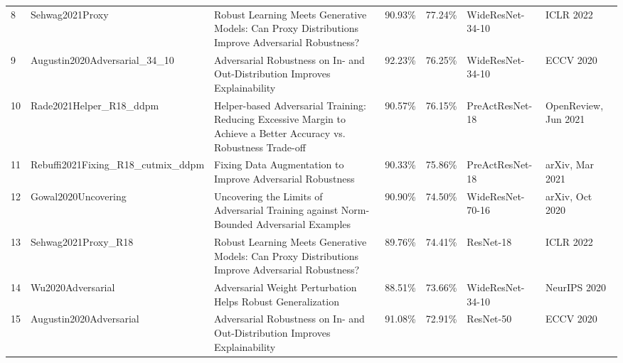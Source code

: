 \begin{table}[]
\begin{tabular}{lllllll}
    8  & Sehwag2021Proxy                          & Robust Learning Meets Generative Models: Can Proxy Distributions Improve Adversarial Robustness?                   & 90.93\%        & 77.24\%         & WideResNet-34-10 & ICLR 2022                                                  \\
    9  & Augustin2020Adversarial\_34\_10          & Adversarial Robustness on In- and Out-Distribution Improves Explainability                                         & 92.23\%        & 76.25\%         & WideResNet-34-10 & ECCV 2020                                                  \\
    10 & Rade2021Helper\_R18\_ddpm                & Helper-based Adversarial Training: Reducing Excessive Margin to Achieve a Better Accuracy vs. Robustness Trade-off & 90.57\%        & 76.15\%         & PreActResNet-18  & OpenReview, Jun 2021                                       \\
    11 & Rebuffi2021Fixing\_R18\_cutmix\_ddpm     & Fixing Data Augmentation to Improve Adversarial Robustness                                                         & 90.33\%        & 75.86\%         & PreActResNet-18  & arXiv, Mar 2021                                            \\
    12 & Gowal2020Uncovering                      & Uncovering the Limits of Adversarial Training against Norm-Bounded Adversarial Examples                            & 90.90\%        & 74.50\%         & WideResNet-70-16 & arXiv, Oct 2020                                            \\
    13 & Sehwag2021Proxy\_R18                     & Robust Learning Meets Generative Models: Can Proxy Distributions Improve Adversarial Robustness?                   & 89.76\%        & 74.41\%         & ResNet-18        & ICLR 2022                                                  \\
    14 & Wu2020Adversarial                        & Adversarial Weight Perturbation Helps Robust Generalization                                                        & 88.51\%        & 73.66\%         & WideResNet-34-10 & NeurIPS 2020                                               \\
    15 & Augustin2020Adversarial                  & Adversarial Robustness on In- and Out-Distribution Improves Explainability                                         & 91.08\%        & 72.91\%         & ResNet-50        & ECCV 2020                                                  \\

\end{tabular}
\end{table}
